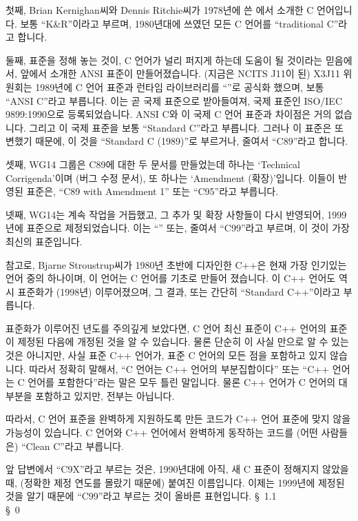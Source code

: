 \begin{faq}
        첫째, Brian Kernighan씨와 Dennis Ritchie씨가 1978년에 쓴 
        에서 소개한 C 언어입니다. 보통
        ``K\&R''이라고 부르며, 1980년대에 쓰였던 모든 C 언어를 ``traditional
        C''라고 합니다.

        둘째, 표준을 정해 놓는 것이, C 언어가 널리 퍼지게 하는데 도움이
        될 것이라는 믿음에서, 앞에서 소개한 ANSI 표준이 만들어졌습니다.
        (지금은 NCITS J11이 된) X3J11 위원회는 1989년에 C 언어 표준과
        런타임 라이브러리를 ``''로
        공식화 했으며, 보통 ``ANSI C''라고 부릅니다. 이는 곧 국제 표준으로
        받아들여져, 국제 표준인 ISO/IEC 9899:1990으로 등록되었습니다. 
        ANSI C와 이 국제 C 언어 표준과 차이점은 거의 없습니다. 그리고
        이 국제 표준을 보통 ``Standard C''라고 부릅니다. 그러나 이 표준은
        또 변했기 때문에, 이 것을 ``Standard C (1989)''로 부르거나,
        줄여서 ``C89''라고 합니다.

        셋째, WG14 그룹은 C89에 대한 두 문서를 만들었는데
        하나는 `Technical Corrigenda'이며
        (버그 수정 문서), 또 하나는 `Amendment (확장)'입니다. 이들이 반영된
        표준은, ``C89 with Amendment 1'' 또는 ``C95''라고 부릅니다.

        넷째, WG14는 계속 작업을 거듭했고, 그 추가 및 확장 사항들이
        다시 반영되어, 1999년에 표준으로 제정되었습니다. 이는 
        ``'' 또는, 줄여서 ``C99''라고 부르며, 이 것이
        가장 최신의 표준입니다.

        참고로, Bjarne Stroustrup씨가 1980년 초반에 디자인한 C++은 현재
        가장 인기있는 언어 중의 하나이며, 이 언어는 C 언어를 기초로 만들어
        졌습니다. 이 C++ 언어도 역시 표준화가 (1998년) 이루어졌으며, 그 결과,
         또는 간단히 ``Standard C++''이라고 부릅니다.

        표준화가 이루어진 년도를 주의깊게 보았다면, C 언어 최신 표준이
        C++ 언어의 표준이 제정된 다음에 개정된 것을 알 수 있습니다.
        물론 단순히 이 사실 만으로 알 수 있는 것은 아니지만, 사실 표준 C++
        언어가, 표준 C 언어의 모든 점을 포함하고 있지 않습니다.
        따라서 정확히 말해서, ``C 언어는 C++ 언어의 부분집합이다'' 또는
        ``C++ 언어는 C 언어를 포함한다''라는 말은 모두 틀린 말입니다.
        물론 C++ 언어가 C 언어의 대부분을 포함하고 있지만, 전부는 아닙니다.

        따라서, C 언어 표준을 완벽하게 지원하도록 만든 코드가 C++ 언어 표준에
        맞지 않을 가능성이 있습니다.  C 언어와 C++ 언어에서 완벽하게 동작하는
        코드를 (어떤 사람들은) ``Clean C''라고 부릅니다.

        앞 답변에서 ``C9X''라고 부르는 것은, 1990년대에 아직, 새 C 표준이
        정해지지 않았을 때, (정확한 제정 연도를 몰랐기 때문에) 붙여진
        이름입니다. 이제는 1999년에 제정된 것을 알기 때문에 ``C99''라고
        부르는 것이 올바른 표현입니다.
\R
	\cite{hs5} \S\ 1.1  \\
        \cite{rational2} \S\ 0 
\end{faq}


